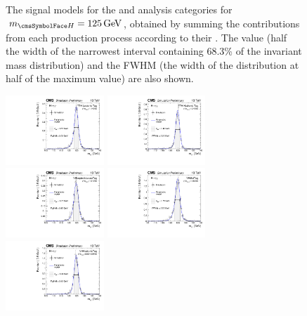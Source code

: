 \begin{figure}[ht!]
\caption{The signal models for the \Untagged and \VBFTag analysis categories for $\mH=125\GeV$, obtained by summing the contributions from each production process according to their \effxacc. The \effSigma value (half the width of the narrowest interval containing 68.3\% of the invariant mass distribution) and the FWHM (the width of the distribution at half of the maximum value) are also shown.}

\label{fig:model:sig_model_per_category}
\end{figure}

\begin{figure}[ht!]
\centering
\includegraphics[width=0.33\textwidth]{modellingFigures/DCBpG/TTHLeptonicTag.pdf} 
\includegraphics[width=0.33\textwidth]{modellingFigures/DCBpG/TTHHadronicTag.pdf}  \\
\includegraphics[width=0.33\textwidth]{modellingFigures/DCBpG/VHLeptonicLooseTag.pdf} 
\includegraphics[width=0.33\textwidth]{modellingFigures/DCBpG/VHMetTag.pdf} \\
\includegraphics[width=0.33\textwidth]{modellingFigures/DCBpG/VHHadronicTag.pdf} \\

\end{figure}
